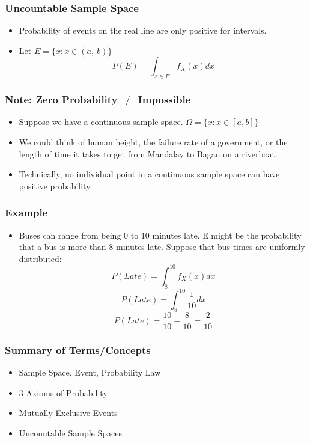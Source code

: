 \documentclass{beamer}
\numberwithin{equation}{section}
\begin{document}
\begin{frame}
\frametitle{Uncountable Sample Space} 
\begin{itemize}
\item[] Probability of events on the real line are only positive for intervals.
\item Let $E=\{x : x \in(a,\ b)\}$
$$P(E)=\int_{x \in E} f_X(x) dx$$
 \end{itemize}
\end{frame}


\begin{frame}
\frametitle{Note: Zero Probability $\neq$ Impossible} 

\begin{itemize}
\item Suppose we have a continuous sample space.  $\Omega=\{x : x \in [a,b]\}$
\item We could think of human height, the failure rate of a government, or the length of time it takes to get from Mandalay to Bagan on a riverboat.
\item Technically, no individual point in a continuous sample space can have positive probability.  
\end{itemize}
\end{frame}



\begin{frame}
\frametitle{Example} 
\begin{itemize}
\item Buses can range from being 0 to 10 minutes late.  E might be the probability that a bus is more than 8 minutes late.  Suppose that bus times are uniformly distributed:
 $$P(Late)=\int_{8}^{10} f_X(x) dx$$
 $$P(Late)=\int_{8}^{10} \frac{1}{10}dx$$
 $$P(Late)=\frac{10}{10}-\frac{8}{10}=\frac{2}{10}$$
\end{itemize}
\end{frame}



\begin{frame}
\frametitle{Summary of Terms/Concepts}
\begin{itemize}
\item Sample Space, Event, Probability Law
\item 3 Axioms of Probability 
\item Mutually Exclusive Events
\item Uncountable Sample Spaces
\end{itemize}
\end{frame}
\end{document}
